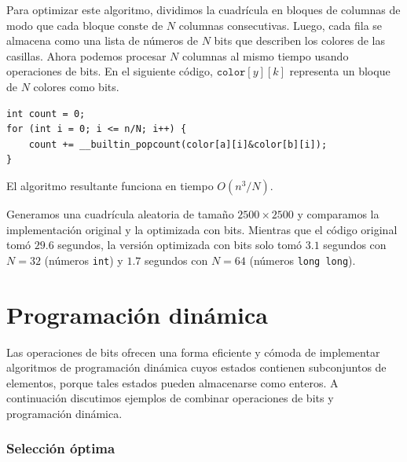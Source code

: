 Para optimizar este algoritmo, dividimos la cuadrícula en bloques
de columnas de modo que cada bloque conste de $N$
columnas consecutivas. Luego, cada fila se almacena como
una lista de números de $N$ bits que describen los colores
de las casillas. Ahora podemos procesar $N$ columnas al mismo tiempo
usando operaciones de bits. En el siguiente código,
$\texttt{color}[y][k]$ representa
un bloque de $N$ colores como bits.
\begin{lstlisting}
int count = 0;
for (int i = 0; i <= n/N; i++) {
    count += __builtin_popcount(color[a][i]&color[b][i]);
}
\end{lstlisting}
El algoritmo resultante funciona en tiempo $O(n^3/N)$.

Generamos una cuadrícula aleatoria de tamaño $2500 \times 2500$
y comparamos la implementación original y la optimizada con bits.
Mientras que el código original tomó $29.6$ segundos,
la versión optimizada con bits solo tomó $3.1$ segundos
con $N=32$ (números \texttt{int}) y $1.7$ segundos
con $N=64$ (números \texttt{long long}).

\section{Programación dinámica}

Las operaciones de bits ofrecen una forma eficiente y cómoda
de implementar algoritmos de programación dinámica
cuyos estados contienen subconjuntos de elementos,
porque tales estados pueden almacenarse como enteros.
A continuación discutimos ejemplos de combinar
operaciones de bits y programación dinámica.

\subsubsection{Selección óptima}

